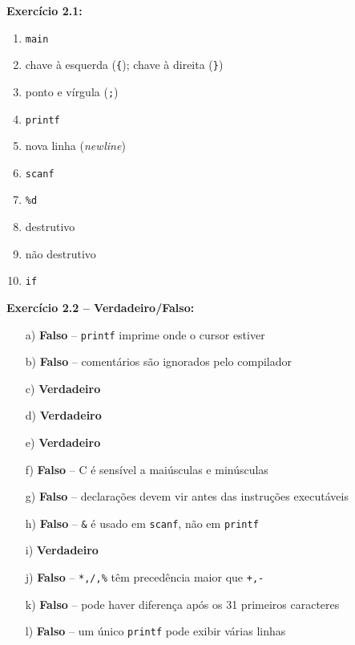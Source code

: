 \documentclass[12pt,a4paper]{article}
\begin{document}
\begin{tcolorbox}[colback=deitellightblue,colframe=deitelblue,title={\bfseries\large Respostas Resumidas}]
\textbf{Exercício 2.1:}
\begin{enumerate}[label=\alph*)]
  \item \texttt{main}
  \item chave à esquerda (\texttt{\{}); chave à direita (\texttt{\}})
  \item ponto e vírgula (\texttt{;})
  \item \texttt{printf}
  \item nova linha (\textit{newline})
  \item \texttt{scanf}
  \item \texttt{\%d}
  \item destrutivo
  \item não destrutivo
  \item \texttt{if}
\end{enumerate}

\medskip\textbf{Exercício 2.2 -- Verdadeiro/Falso:}
\begin{itemize}[noitemsep]
  \item[a)] \textcolor{deitelred}{\textbf{Falso}} -- \texttt{printf} imprime onde o cursor estiver
  \item[b)] \textcolor{deitelred}{\textbf{Falso}} -- comentários são ignorados pelo compilador
  \item[c)] \textcolor{deitelgreen}{\textbf{Verdadeiro}}
  \item[d)] \textcolor{deitelgreen}{\textbf{Verdadeiro}}
  \item[e)] \textcolor{deitelgreen}{\textbf{Verdadeiro}}
  \item[f)] \textcolor{deitelred}{\textbf{Falso}} -- C é sensível a maiúsculas e minúsculas
  \item[g)] \textcolor{deitelred}{\textbf{Falso}} -- declarações devem vir antes das instruções executáveis
  \item[h)] \textcolor{deitelred}{\textbf{Falso}} -- \texttt{\&} é usado em \texttt{scanf}, não em \texttt{printf}
  \item[i)] \textcolor{deitelgreen}{\textbf{Verdadeiro}}
  \item[j)] \textcolor{deitelred}{\textbf{Falso}} -- \texttt{*,/,\%} têm precedência maior que \texttt{+,-}
  \item[k)] \textcolor{deitelred}{\textbf{Falso}} -- pode haver diferença após os 31 primeiros caracteres
  \item[l)] \textcolor{deitelred}{\textbf{Falso}} -- um único \texttt{printf} pode exibir várias linhas
\end{itemize}
\end{tcolorbox}
\end{document}
